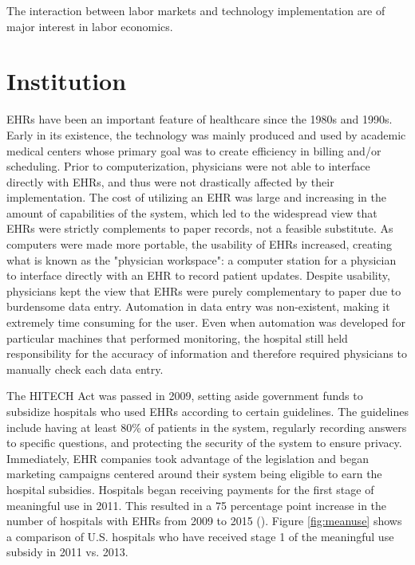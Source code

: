 \documentclass[11pt]{article}
\begin{document}
The interaction between labor markets and technology implementation are of major interest in labor economics. 



\section{Institution}

EHRs have been an important feature of healthcare since the 1980s and 1990s. Early in its existence, the technology was mainly produced and used by academic medical centers whose primary goal was to create efficiency in billing and/or scheduling. Prior to computerization, physicians were not able to interface directly with EHRs, and thus were not drastically affected by their implementation. The cost of utilizing an EHR was large and increasing in the amount of capabilities of the system, which led to the widespread view that EHRs were strictly complements to paper records, not a feasible substitute. As computers were made more portable, the usability of EHRs increased, creating what is known as the "physician workspace": a computer station for a physician to interface directly with an EHR to record patient updates. Despite usability, physicians kept the view that EHRs were purely complementary to paper due to burdensome data entry. Automation in data entry was non-existent, making it extremely time consuming for the user. Even when automation was developed for particular machines that performed monitoring, the hospital still held responsibility for the accuracy of information and therefore required physicians to manually check each data entry. 

The HITECH Act was passed in 2009, setting aside government funds to subsidize hospitals who used EHRs according to certain guidelines. The guidelines include having at least 80\% of patients in the system, regularly recording answers to specific questions, and protecting the security of the system to ensure privacy. Immediately, EHR companies took advantage of the legislation and began marketing campaigns centered around their system being eligible to earn the hospital subsidies. Hospitals began receiving payments for the first stage of meaningful use in 2011. This resulted in a 75 percentage point increase in the number of hospitals with EHRs from 2009 to 2015 (\cite{stats}). Figure \ref{fig:meanuse} shows a comparison of U.S. hospitals who have received stage 1 of the meaningful use subsidy in 2011 vs. 2013. 
\end{document}
